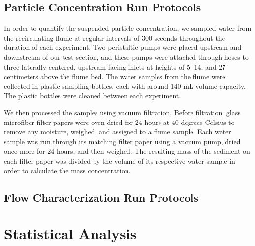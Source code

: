 \documentclass{scrreprt}
\begin{document}
\subsection{Particle Concentration Run Protocols}

In order to quantify the suspended particle concentration, we sampled water from the recirculating flume at regular intervals of 300 seconds throughout the duration of each experiment. Two peristaltic pumps were placed upstream and downstream of our test section, and these pumps were attached through hoses to three laterally-centered, upstream-facing inlets at heights of 5, 14, and 27 centimeters above the flume bed. The water samples from the flume were collected in plastic sampling bottles, each with around 140 mL volume capacity. The plastic bottles were cleaned between each experiment. 

We then processed the samples using vacuum filtration. Before filtration, glass microfiber filter papers were oven-dried for 24 hours at 40 degrees Celsius to remove any moisture, weighed, and assigned to a flume sample. Each water sample was run through its matching filter paper using a vacuum pump, dried once more for 24 hours, and then weighed. The resulting mass of the sediment on each filter paper was divided by the volume of its respective water sample in order to calculate the mass concentration.

\subsection{Flow Characterization Run Protocols}


\section{Statistical Analysis}




\end{document}
